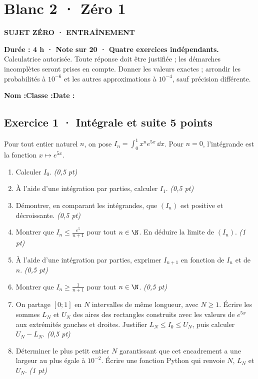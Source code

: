 \mxnewpage{}\label{sujet:8-1}

\section*{Blanc 2 · Zéro 1}

{\sffamily\bfseries\color{mxmint}SUJET ZÉRO · ENTRAÎNEMENT\par}

\textbf{Durée : 4 h · Note sur 20 · Quatre exercices indépendants.}\\Calculatrice autorisée. Toute réponse doit être justifiée ; les démarches incomplètes seront prises en compte. Donner les valeurs exactes ; arrondir les probabilités à $10^{-6}$ et les autres approximations à $10^{-4}$, sauf précision différente.

\smallskip\textbf{Nom :}\enspace\dotfill\quad\textbf{Classe :}\enspace\dotfill\quad\textbf{Date :}\enspace\dotfill

\subsection*{Exercice 1 · Intégrale et suite \hfill 5 points}Pour tout entier naturel $n$, on pose $I_n=\displaystyle\int_0^1x^ne^{5x}\,\dd x$. Pour $n=0$, l'intégrande est la fonction $x\mapsto e^{5x}$.

\begin{enumerate}

\item Calculer $I_0$. \hfill\textit{(0{,}5 pt)}

\item À l'aide d'une intégration par parties, calculer $I_1$. \hfill\textit{(0{,}5 pt)}

\item Démontrer, en comparant les intégrandes, que $(I_n)$ est positive et décroissante. \hfill\textit{(0{,}5 pt)}

\item Montrer que $I_n\le\frac{e^{5}}{n+1}$ pour tout $n\in\N$. En déduire la limite de $(I_n)$. \hfill\textit{(1 pt)}

\item À l'aide d'une intégration par parties, exprimer $I_{n+1}$ en fonction de $I_n$ et de $n$. \hfill\textit{(0{,}5 pt)}

\item Montrer que $I_n\ge\frac1{n+1}$ pour tout $n\in\N$. \hfill\textit{(0{,}5 pt)}

\item On partage $[0;1]$ en $N$ intervalles de même longueur, avec $N\ge1$. Écrire les sommes $L_N$ et $U_N$ des aires des rectangles construits avec les valeurs de $e^{5x}$ aux extrémités gauches et droites. Justifier $L_N\le I_0\le U_N$, puis calculer $U_N-L_N$. \hfill\textit{(0{,}5 pt)}

\item Déterminer le plus petit entier $N$ garantissant que cet encadrement a une largeur au plus égale à $10^{-2}$. Écrire une fonction Python qui renvoie $N$, $L_N$ et $U_N$. \hfill\textit{(1 pt)}

\end{enumerate}

